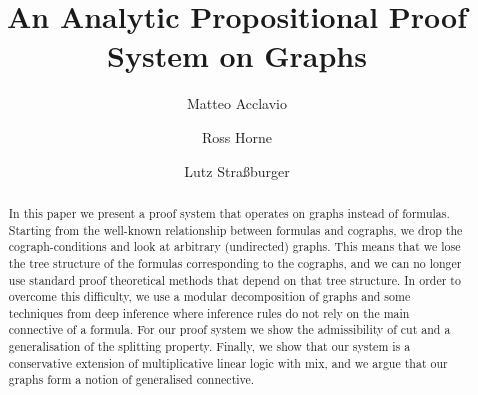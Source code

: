 \documentclass{lmcs} %
\theoremstyle{plain}
\begin{document}
\title[An Analytic Propositional Proof System on Graphs]{An Analytic Propositional Proof System on Graphs}
  
  
\author[M.~Acclavio]{Matteo Acclavio}
\address{
Dipartimento di Matematica e Fisica,
Università Roma Tre,
Roma,
Italy
}

\author[R.~Horne]{Ross Horne}	
\address{
Computer Science,
University of Luxembourg,
Esch-sur-Alzette,
Luxembourg
\\ 
}

\author[L.~Stra\ss burger]{Lutz Stra\ss burger}
\address{
 Inria, Equipe Partout,
 Ecole Polytechnique,
 LIX UMR~7161,
 France
}





\begin{abstract}
  In this paper we present a proof system that operates on graphs
  instead of formulas.  Starting from the well-known relationship
  between formulas and cographs, we drop the cograph-conditions and
  look at arbitrary (undirected) graphs. This means that we lose the
  tree structure of the formulas corresponding to the
  cographs, and we can no longer use standard proof theoretical methods
  that depend on that tree structure. In order to overcome this
  difficulty, we use a modular decomposition of graphs and some
  techniques from deep inference where inference rules do not rely on
  the main connective of a formula. For our proof system we show the
  admissibility of cut and a generalisation of the splitting
  property. Finally, we show that our system is a conservative
  extension of multiplicative linear logic with mix, and we argue that our graphs form a notion of generalised connective.
\end{abstract}
\end{document}
